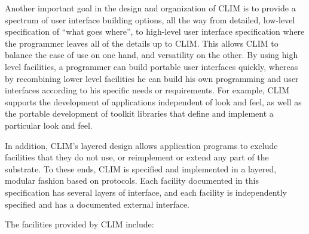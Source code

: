 Another important goal in the design and organization of CLIM is to provide a
spectrum of user interface building options, all the way from detailed,
low-level specification of ``what goes where'', to high-level user interface
specification where the programmer leaves all of the details up to CLIM.  This
allows CLIM to balance the ease of use on one hand, and versatility on the
other.  By using high level facilities, a programmer can build portable user
interfaces quickly, whereas by recombining lower level facilities he can build
his own programming and user interfaces according to his specific needs or
requirements.  For example, CLIM supports the development of applications
independent of look and feel, as well as the portable development of toolkit
libraries that define and implement a particular look and feel.

In addition, CLIM's layered design allows application programs to exclude
facilities that they do not use, or reimplement or extend any part of the
substrate.  To these ends, CLIM is specified and implemented in a layered,
modular fashion based on protocols.  Each facility documented in this
specification has several layers of interface, and each facility is
independently specified and has a documented external interface.

The facilities provided by CLIM include:

